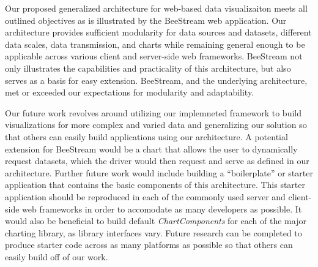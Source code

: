 %
%
Our proposed generalized architecture for web-based data visualizaiton meets all outlined objectives as is illustrated by the BeeStream web application.  Our architecture provides sufficient modularity for data sources and datasets, different data scales, data transmission, and charts while remaining general enough to be applicable across various client and server-side web frameworks.  BeeStream not only illustrates the capabilities and practicality of this architecture, but also serves as a basis for easy extension.  BeeStream, and the underlying architecture, met or exceeded our expectations for modularity and adaptability.  \par

Our future work revolves around utilizing our implemneted framework to build visualizations for more complex and varied data and generalizing our solution so that others can easily build applications using our architecture.  A potential extension for BeeStream would be a chart that allows the user to dynamically request datasets, which the driver would then request and serve as defined in our architecture.  Further future work would include building a ``boilerplate'' or starter application that contains the basic components of this architecture.  This starter application should be reproduced in each of the commonly used server and client-side web frameworks in order to accomodate as many developers as possible.  It would also be beneficial to build default \textit{ChartComponents} for each of the major charting library, as library interfaces vary.  Future research can be completed to produce starter code across as many platforms as possible so that others can easily build off of our work.
